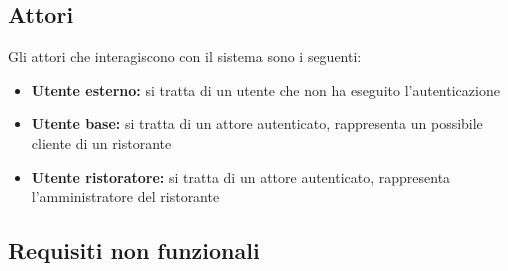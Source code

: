\subsection{Attori}
Gli attori che interagiscono con il sistema sono i seguenti:
\begin{itemize}
	\item \textbf{Utente esterno:} si tratta di un utente che non ha eseguito l'autenticazione
	\item \textbf{Utente base:} si tratta di un attore autenticato, rappresenta un possibile cliente di un ristorante
	\item \textbf{Utente ristoratore:} si tratta di un attore autenticato, rappresenta l'amministratore del ristorante
\end{itemize}

\subsection{Requisiti non funzionali}

